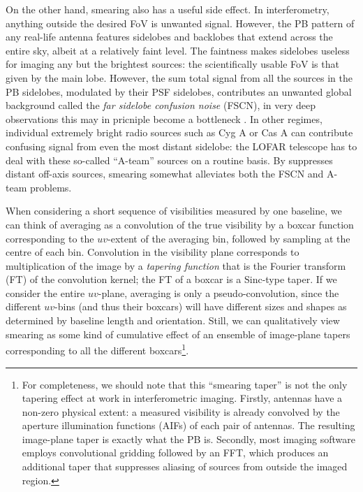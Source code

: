 \documentclass[useAMS,usenatbib]{mn2e}
\begin{document}
On the other hand, smearing also has a useful side effect. In interferometry, anything outside the desired FoV is unwanted 
signal. However, the PB pattern of any real-life antenna features sidelobes and backlobes 
that extend across the entire sky, albeit at a relatively faint level. The faintness makes sidelobes useless for imaging any 
but the brightest sources: the scientifically usable FoV is that given by the main lobe. However, the 
sum total signal from all the sources in the PB sidelobes, modulated by their PSF sidelobes, contributes an unwanted global 
background called the \emph{far sidelobe confusion noise} (FSCN), in very deep observations this may in pricniple become a
bottleneck \citep{icea-fscn}. In other regimes, individual extremely bright radio sources such as Cyg A or 
Cas A can contribute confusing signal from even the most distant  sidelobe: the LOFAR telescope \citep{LOFAR} has to deal 
with these so-called ``A-team'' sources 
on a routine basis. By suppresses distant off-axis sources, smearing somewhat alleviates both the FSCN and A-team problems.

When considering a short sequence of visibilities measured by one baseline, we can think of averaging as a convolution of the 
true visibility by a boxcar function corresponding to the $uv$-extent of the averaging bin, followed by sampling at the 
centre of each bin. Convolution in the visibility plane corresponds to multiplication of the image by a \emph{tapering function} 
that is the Fourier transform (FT) of the convolution kernel; the FT of a boxcar is a Sinc-type taper. If
we consider the entire $uv$-plane, averaging is only a pseudo-convolution, since the different $uv$-bins (and thus
their boxcars) will have different sizes and shapes as determined by baseline length and orientation. Still, we can 
qualitatively view smearing  as some kind of cumulative effect of an ensemble of image-plane tapers corresponding to all the 
different boxcars\footnote{For completeness, we should note that  this ``smearing taper'' is not the only tapering effect 
at work in interferometric imaging. Firstly, antennas have a non-zero 
physical extent: a measured visibility is already convolved by the aperture illumination functions (AIFs) of each pair of 
antennas. The resulting image-plane taper is exactly what the PB is. Secondly, most imaging software employs 
convolutional gridding followed by an FFT, which produces an additional taper that suppresses aliasing of sources from 
outside the imaged region.}. 
\end{document}
